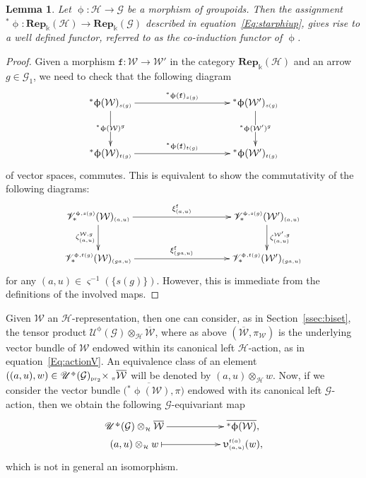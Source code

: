 \documentclass[pdftex]{sigma}
\numberwithin{equation}{section}
\newtheorem{Lemma}[Theorem]{Lemma}
\newcommand{\tensor}[1]{\otimes_{\scriptscriptstyle{#1}}}
\newcommand{\bara}[1]{\overline{#1}}
\newcommand{\Rep}[1]{\mathbf{Rep}_{\Sscript{\Bbbk}}(#1)}
\newcommand{\tF}{\texttt{f}}
\newcommand{\Ga}{\cG_{\Sscript{1}}}
\newcommand{\uU}{\mathscr{U}}
\newcommand{\vV}{\mathscr{V}}
\newcommand{\cG}{{\mathcal G}}
\newcommand{\cH}{{\mathcal H}}
\newcommand{\cW}{{\mathcal W}}
\newcommand{\Sscript}[1]{\scriptscriptstyle{#1}}
\newcommand{\due}[3]{{}_{{#2 }} {#1}_{{ #3}} }
\newcommand{\upg}{\uU^{\Sscript{\upphi}}(\cG)}
\newcommand{\pls}{{}^{*}\upphi}
\begin{document}
\begin{Lemma}\label{lema:Co-Induction}Let $\upphi\colon \cH \to \cG$ be a morphism of groupoids. Then the assignment ${}^{*}\upphi\colon \Rep{\cH} \to \Rep{\cG}$ described in equation~\eqref{Eq:starphiup}, gives rise to a well defined functor, referred to as {\rm the co-induction functor} of $\upphi$.
\end{Lemma}
\begin{proof}Given a morphism $\tF\colon \cW \to \cW'$ in the category $\Rep{\cH}$ and an arrow $g \in \Ga$, we need to check that the following diagram
\begin{gather*}
\xymatrix@C=45pt@R=35pt{ \pls(\cW)_{\Sscript{s(g)}} \ar@{->}^-{
\pls(\tF)_{\Sscript{s(g)}}}[rr]
\ar@{->}|-{\pls(\cW)^{\Sscript{g}}}[d] & &
\pls(\cW')_{\Sscript{s(g)}} \ar@{->}|-{\pls(\cW')^{\Sscript{g}}}[d]
\\ \pls(\cW)_{\Sscript{t(g)}} \ar@{->}^-{
\pls(\tF)_{\Sscript{t(g)}} }[rr] & & \pls(\cW')_{\Sscript{t(g)}} }
\end{gather*}
of vector spaces, commutes. This is equivalent to show the commutativity of the following diag\-rams:
\begin{gather*}
\xymatrix@C=45pt@R=25pt{ \vV^{\Sscript{\upphi,
s(g)}}_*(\cW)_{\Sscript{(a, u)}} \ar@{->}^-{
\xi^{\Sscript{\tF}}_{\Sscript{(a,u)}}}[rr]
\ar@{->}_-{\zeta_{\Sscript{(a,u)}}^{\Sscript{\cW, g}}}[d] & &
\vV^{\Sscript{\upphi, s(g)}}_*(\cW')_{\Sscript{(a, u)}}
\ar@{->}^-{\zeta_{\Sscript{(a,u)}}^{\Sscript{\cW', g}}}[d] \\
\vV^{\Sscript{\upphi, t(g)}}_*(\cW)_{\Sscript{(ga, u)}}
\ar@{->}^-{ \xi^{\Sscript{\tF}}_{\Sscript{(ga,u)}} }[rr] & &
\vV^{\Sscript{\upphi, t(g)}}_*(\cW')_{\Sscript{(ga, u)}} }
\end{gather*}
for any $(a, u) \in \varsigma^{-1}(\{s(g)\})$. However, this is immediate from the definitions of the involved maps.
\end{proof}

\begin{Remark}Given $\cW$ an $\cH$-representation, then one can consider, as in Section~\ref{ssec:biset}, the tensor product $\upg \tensor{\cH} \bara{\cW}$, where as above $(\bara{\cW},\pi_{\Sscript{\cW}})$ is the underlying vector bundle of $\cW$ endowed within its canonical left $\cH$-action, as in equation~\eqref{Eq:actionV}. An equivalence class of an element $((a,u),w) \in \upg \due \times {\Sscript{{\rm pr}_2}}{\; \Sscript{\pi}} \bara{\cW}$ will be denoted by $(a,u)\tensor{\cH}w$. Now, if we consider the vector bundle $\big(\bara{{}^*\upphi(\cW)}, \pi \big)$ endowed with its canonical left $\cG$-action, then we obtain the following $\cG$-equivariant map
\begin{gather*}
\xymatrix@R=0pt{ \upg \tensor{\cH} \bara{\cW} \ar@{->}^-{}[rr] & & \bara{{}^*\upphi(\cW)}, \\ (a,u)\tensor{\cH}w \ar@{|->}^-{}[rr] & &
\upupsilon^{\Sscript{t(a)}}_{\Sscript{(a,u)}} (w), }
\end{gather*}
which is not in general an isomorphism.
\end{Remark}
\end{document}
